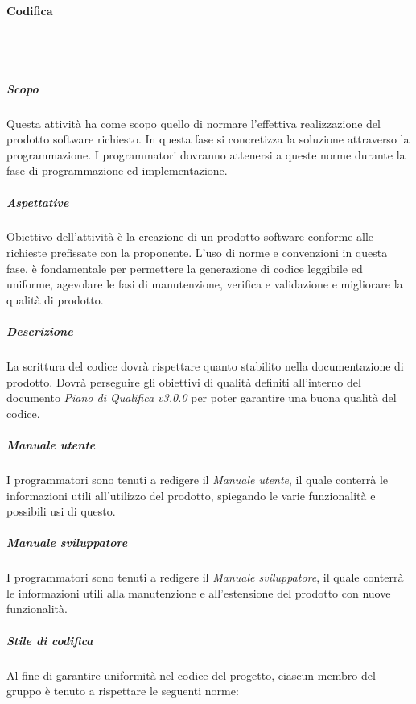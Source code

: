 		\paragraph{Codifica} \mbox{}\\ \mbox{}\\
			\subparagraph{Scopo} 
			Questa attività ha come scopo quello di normare l'effettiva realizzazione del prodotto software richiesto. In questa fase si concretizza la soluzione attraverso la programmazione. I programmatori dovranno attenersi a queste norme durante la fase di programmazione ed implementazione. \newline \newline
			\subparagraph{Aspettative} 
			Obiettivo dell'attività è la creazione di un prodotto software conforme alle richieste prefissate con la proponente.
			L'uso di norme e convenzioni in questa fase, è fondamentale per permettere la generazione di codice leggibile ed uniforme,  agevolare le fasi di manutenzione, verifica e validazione e migliorare la qualità di prodotto. \newline \newline
			\subparagraph{Descrizione}
			La scrittura del codice dovrà rispettare quanto stabilito nella documentazione di prodotto. Dovrà perseguire gli obiettivi di qualità definiti all'interno del documento \textit{Piano di Qualifica v3.0.0} per poter garantire una buona qualità del codice. \newline \newline
			\subparagraph{Manuale utente} 
			I programmatori sono tenuti a redigere il \textit{Manuale utente}, il quale conterrà le informazioni utili all'utilizzo del prodotto, spiegando le varie funzionalità e possibili usi di questo. \newline \newline
			\subparagraph{Manuale sviluppatore}
			I programmatori sono tenuti a redigere il \textit{Manuale sviluppatore}, il quale conterrà le informazioni utili alla manutenzione e all'estensione del prodotto con nuove funzionalità. \newline \newline
			\subparagraph{Stile di codifica} 
			Al fine di garantire uniformità nel codice del progetto, ciascun membro del gruppo è
			tenuto a rispettare le seguenti norme:
